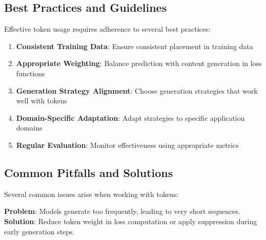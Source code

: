 \subsection{Best Practices and Guidelines}

Effective \eos{} token usage requires adherence to several best practices:

\begin{enumerate}
\item \textbf{Consistent Training Data}: Ensure consistent \eos{} placement in training data
\item \textbf{Appropriate Weighting}: Balance \eos{} prediction with content generation in loss functions
\item \textbf{Generation Strategy Alignment}: Choose generation strategies that work well with \eos{} tokens
\item \textbf{Domain-Specific Adaptation}: Adapt \eos{} strategies to specific application domains
\item \textbf{Regular Evaluation}: Monitor \eos{} effectiveness using appropriate metrics
\end{enumerate}
\begin{comment}
Feedback: This list is good. To make it more actionable:
1.  **Consistent Training Data**: "Double-check your data pipeline to ensure that *every* training example has a correctly placed [EOS] token. Inconsistent data is a common source of poor termination behavior."
2.  **Generation Strategy Alignment**: "Be aware that sampling methods (top-k, nucleus) can sometimes 'sample around' the [EOS] token even when its probability is high. If precise termination is critical, consider using greedy decoding or beam search, or implementing a hard probability threshold for the [EOS] token."
3.  **Regular Evaluation**: "Don't just rely on BLEU or ROUGE. Create a 'length distribution' plot of your generated text versus your test set. If the distributions are wildly different, it's a strong sign that your model's [EOS] handling is miscalibrated."
\end{comment}

\subsection{Common Pitfalls and Solutions}

Several common issues arise when working with \eos{} tokens:

\textbf{Problem}: Models generate \eos{} too frequently, leading to very short sequences.
\textbf{Solution}: Reduce \eos{} token weight in loss computation or apply \eos{} suppression during early generation steps.

